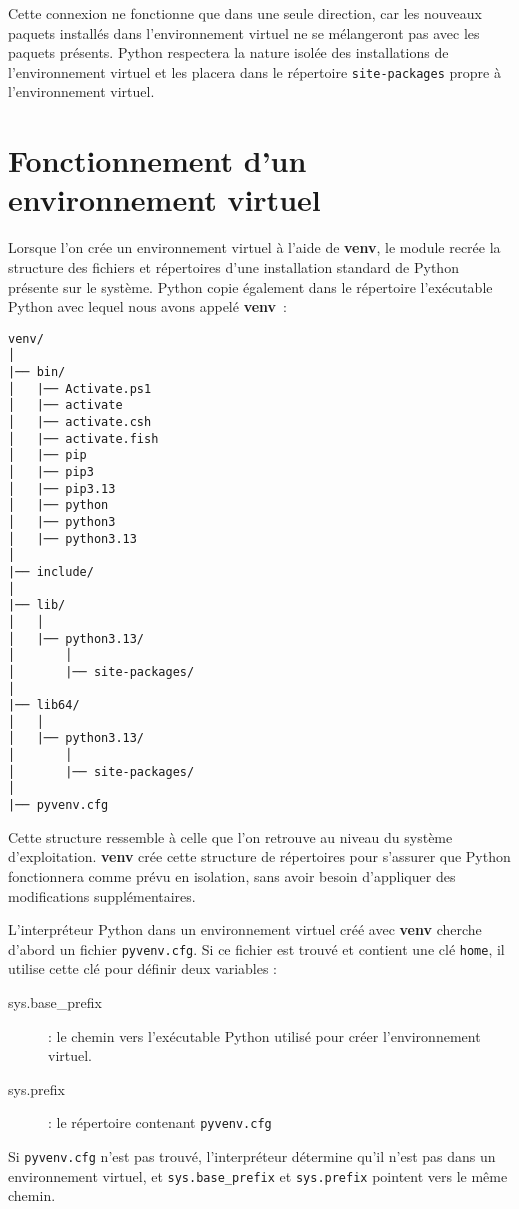 Cette connexion ne fonctionne que dans une seule direction, car les nouveaux paquets installés dans l'environnement virtuel ne se mélangeront pas avec les paquets présents. Python respectera la nature isolée des installations de l'environnement virtuel et les placera dans le répertoire \texttt{site-packages} propre à l’environnement virtuel.

\section{Fonctionnement d'un environnement virtuel}

Lorsque l'on crée un environnement virtuel à l’aide de \textbf{venv}, le module recrée la structure des fichiers et répertoires d’une installation standard de Python présente sur le système. Python copie également dans le répertoire l’exécutable Python avec lequel nous avons appelé \textbf{venv} :
\begin{verbatim}
venv/
│
|── bin/
│   |── Activate.ps1
│   |── activate
│   |── activate.csh
│   |── activate.fish
│   |── pip
│   |── pip3
│   |── pip3.13
│   |── python
│   |── python3
│   |── python3.13
│
|── include/
│
|── lib/
│   │
│   |── python3.13/
│       │
│       |── site-packages/
│
|── lib64/
│   │
│   |── python3.13/
│       │
│       |── site-packages/
│
|── pyvenv.cfg
\end{verbatim}

Cette structure ressemble à celle que l'on retrouve au niveau du système d'exploitation. \textbf{venv} crée cette structure de répertoires pour s’assurer que Python fonctionnera comme prévu en isolation, sans avoir besoin d’appliquer des modifications supplémentaires. 

L'interpréteur Python dans un environnement virtuel créé avec \textbf{venv} cherche d'abord un fichier \texttt{pyvenv.cfg}. Si ce fichier est trouvé et contient une clé \texttt{home}, il utilise cette clé pour définir deux variables :

\begin{description}
    \item[sys.base\_prefix] : le chemin vers l'exécutable Python utilisé pour créer l'environnement virtuel.
    \item[sys.prefix] : le répertoire contenant \texttt{pyvenv.cfg}
\end{description}

Si \texttt{pyvenv.cfg} n'est pas trouvé, l'interpréteur détermine qu'il n'est pas dans un environnement virtuel, et \texttt{sys.base\_prefix} et \texttt{sys.prefix} pointent vers le même chemin.

